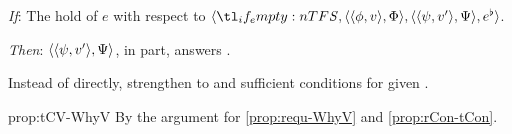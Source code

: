 \begin{note}
  \begin{proposition}
    \label{prop:tCV-WhyV}

    \begin{itenum}
    \item[\emph{If}:]
      The  hold of \(e\) with respect to \(\langle \vAgent{}, \pvp{\phi}{v}{\Phi}, \pvp{\psi}{v'}{\Psi}, e^{\flat} \rangle\).
    \item[\emph{Then}:]
      \(\langle \langle \psi, v' \rangle, \Psi \rangle\), in part, answers \qWhyV{}.
    \end{itenum}
    \vspace{-\baselineskip}
  \end{proposition}

  Instead of \requ{} directly, strengthen to \tCV{} and sufficient conditions for \requ{} given \tCV{}.

  \begin{argument}{prop:tCV-WhyV}
    By the argument for \autoref{prop:requ-WhyV} and \autoref{prop:rCon-tCon}.
  \end{argument}

    \begin{proposition}
    \label{prop:tCV-WhyV-ces}


\end{proposition}
\end{note}
